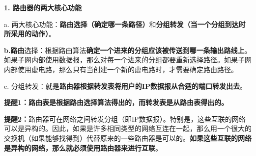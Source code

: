 {\textbf{1. 路由器的两大核心功能}}

{a.
两大核心功能：}\textbf{路由选择（确定哪一条路径）}{和}\textbf{分组转发（当一个分组到达时所采用的动作）}{。}

\textbf{b.路由}{选择：根据路由算法}\textbf{{确定一个进来的分组应该被传送到哪一条输出路线上}}{。如果子网内部使用数据报，那么对每一个进来的分组都要重新选择路径。如果子网内部使用虚电路，那么只有当创建一个新的虚电路时，才需要确定路由路径。}

c.
分组转发：就是\textbf{{路由器根据转发表将用户的IP数据报从合适的端口转发出去}}。

\textbf{{\textbf{{提醒1：}}{路由表是根据路由选择算法得出的，而转发表是从路由表得出的。}{}}}

\textbf{{\textbf{{\textbf{提醒2：}}}}}{路由器可在网络之间转发分组（即IP数据报）。特别是，这些互联的网络可以是异构的。}因此{，如果是许多相同类型的网络互连在一起，那么用一个很大的交换机（如果能够找得到）代替原来的一些路由器是可以的。\textbf{如果这些互联的网络是异构的网络，那么就必须使用路由器来进行互联}。}
